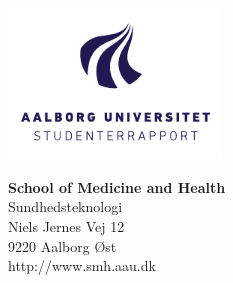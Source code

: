 

{}
\thispagestyle{empty}

\begin{minipage}[t]{0.48\textwidth}
\vspace*{-25pt}			%
\includegraphics[height=4cm]{figures/AAU-logo-stud-DK-RGB}
\end{minipage}
\hfill
\begin{minipage}[t]{0.48\textwidth}
{\small 
\textbf{School of Medicine and Health}\\
Sundhedsteknologi \\
Niels Jernes Vej 12 \\
9220 Aalborg Øst \\
http://www.smh.aau.dk}
\end{minipage}

\vspace*{1cm}

